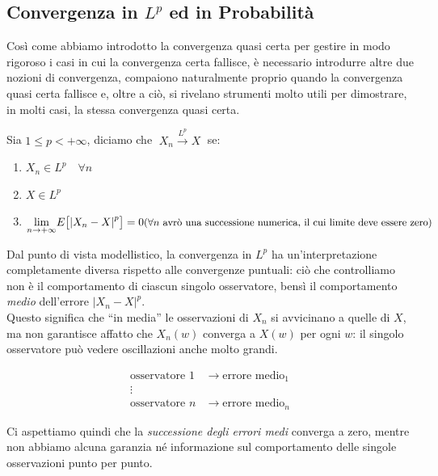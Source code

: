 \subsection{Convergenza in $L^p$ ed in Probabilità}

Così come abbiamo introdotto la convergenza quasi certa per gestire in modo rigoroso i casi in cui la convergenza certa fallisce, è necessario introdurre altre due nozioni di convergenza, compaiono naturalmente proprio quando la convergenza quasi certa fallisce e, oltre a ciò, si rivelano strumenti molto utili per dimostrare, in molti casi, la stessa convergenza quasi certa.

\begin{definizione}[Convergenza in $L^p$]
    Sia $1\leq p< + \infty$, diciamo che $\;X_n \overset{L^p}{\longrightarrow} X\;$ se:
    \begin{enumerate}
        \item $X_n\in L^p\quad \forall n$
        \item $X\in L^p$
        \item $\underset{n\to+\infty}{\lim}E\bigl[\left|X_n-X\right|^p\bigr] = 0\hfill \text{\small ($\forall n$ avrò una successione numerica, il cui limite deve essere zero)}$
    \end{enumerate}
\end{definizione}

Dal punto di vista modellistico, la convergenza in \(L^p\) ha un’interpretazione completamente diversa rispetto alle convergenze puntuali: ciò che controlliamo non è il comportamento di ciascun singolo osservatore, bensì il comportamento \emph{medio} dell’errore \(|X_n - X|^p\).\\
Questo significa che ``in media'' le osservazioni di \(X_n\) si avvicinano a quelle di \(X\), ma non garantisce affatto che \(X_n(w)\) converga a \(X(w)\) per ogni \(w\): il singolo osservatore può vedere oscillazioni anche molto grandi.

\[
\begin{aligned}
\text{osservatore } 1 &\longrightarrow \text{errore medio}_1\\
\vdots\\
\text{osservatore } n &\longrightarrow \text{errore medio}_n
\end{aligned}
\]

Ci aspettiamo quindi che la \emph{successione degli errori medi} converga a zero, mentre non abbiamo alcuna garanzia né informazione sul comportamento delle singole osservazioni punto per punto.


